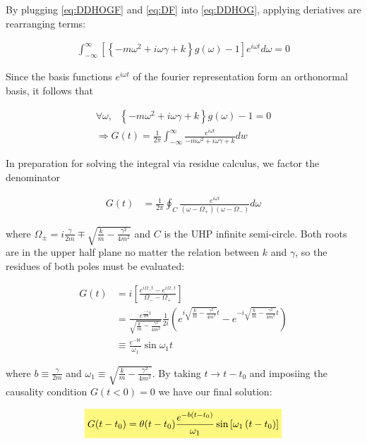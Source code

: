 \documentclass[11pt]{article}
\theoremstyle{plain}
\theoremstyle{definition}
\newcommand{\highlight}[1]{%
  \colorbox{yellow!50}{$\displaystyle#1$}}
\begin{document}
By plugging \eqref{eq:DDHOGF} and \eqref{eq:DF} into \eqref{eq:DDHOG}, applying deriatives are rearranging terms:

\begin{align}
    \int_{-\infty}^{\infty} \left[ \left\{ -m\omega^2 + i\omega \gamma + k \right\}g(\omega) - 1 \right] e^{i\omega t} d\omega = 0
\end{align}

Since the basis functions $e^{i\omega t}$ of the fourier representation form an orthonormal basis, it follows that

\begin{align}
    \forall \omega, \ \ \ \left\{ -m\omega^2 + i\omega \gamma + k \right\}g(\omega) - 1 = 0 \\
    \Rightarrow G(t) = \frac{1}{2\pi} \int_{-\infty}^{\infty} \frac{e^{i\omega t}}{-m\omega^2 + i\omega \gamma + k} dw
\end{align}

In preparation for solving the integral via residue calculus, we factor the denominator

\begin{align}
    G(t) &= \frac{1}{2\pi}\oint_C \frac{e^{i\omega t}}{\left( \omega-\Omega_+ \right) \left( \omega - \Omega_- \right)} d\omega
\end{align}

where $\Omega_{\pm} = i\frac{\gamma}{2m} \mp \sqrt{\frac{k}{m}-\frac{\gamma^2}{4m^2}}$ and $C$ is the UHP infinite semi-circle.  Both roots are in the upper half plane no matter the relation between $k$ and $\gamma$, so the residues of both poles must be evaluated:

\begin{align}
    G(t) &= i \left[ \frac{e^{i\Omega_+ t} - e^{i \Omega_- t}}{\Omega_- - \Omega_+} \right] \\
    &= \frac{e^{\frac{-\gamma}{2m} t}}{\sqrt{\frac{k}{m}-\frac{\gamma^2}{4m^2}}} \frac{1}{2i} \left( e^{i \sqrt{\frac{k}{m}-\frac{\gamma^2}{4m^2}} t} - e^{-i \sqrt{\frac{k}{m}-\frac{\gamma^2}{4m^2}} t} \right) \\
    &\equiv \frac{e^{-bt}}{\omega_1}\sin{\omega_1 t}
\end{align}

where $b \equiv \frac{\gamma}{2m}$ and $\omega_1 \equiv \sqrt{\frac{k}{m}-\frac{\gamma^2}{4m^2}}$. By taking $t \rightarrow t-t_0$ and imposiing  the causality condition $G(t<0)=0$ we have our final solution:


\begin{align}
    \highlight{G(t-t_0) = \theta(t-t_0) \frac{e^{-b\left( t-t_0 \right)}}{\omega_1}\sin\left[ \omega_1 \left( t-t_0 \right) \right]}
\end{align}
\end{document}
